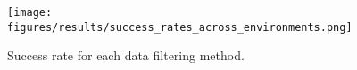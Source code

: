 

\begin{figure}[ht!] %
\centering
\texttt{[image: figures/results/success\_rates\_across\_environments.png]}
\caption{Success rate for each data filtering method.}

\label{fig:ablation_filtering_success} %
\end{figure}


